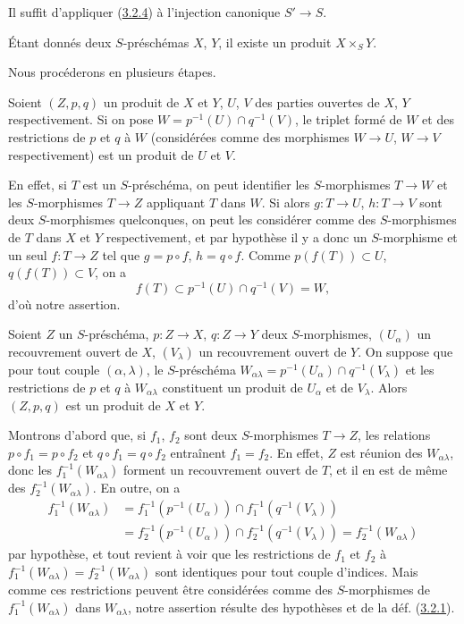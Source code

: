 Il suffit d'appliquer (\hyperref[I.3.2.4-fr]{3.2.4}) à l'injection canonique
$S'\to S$.

\begin{theorem}[3.2.6]
\label{I.3.2.6-fr}
Étant donnés deux $S$-préschémas $X$, $Y$, il existe un produit
$X\times_S Y$.
\end{theorem}

Nous procéderons en plusieurs étapes.

\begin{lemma}[3.2.6.1]
\label{I.3.2.6.1-fr}
Soient $(Z,p,q)$ un produit de $X$ et $Y$, $U$, $V$ des parties ouvertes de
$X$, $Y$ respectivement. Si on pose
$W=p^{-1}(U)\cap q^{-1}(V)$, le triplet formé de $W$ et des restrictions de
$p$ et $q$ à $W$ \textup{(considérées comme des morphismes $W\to U$,
$W\to V$ respectivement)} est un produit de $U$ et $V$.
\end{lemma}

En effet, si $T$ est un $S$-préschéma, on peut identifier les $S$-morphismes
$T\to W$ et les $S$-morphismes $T\to Z$ appliquant $T$ dans $W$. Si alors
$g:T\to U$, $h:T\to V$ sont deux $S$-morphismes quelconques, on peut les
considérer comme des $S$-morphismes de $T$ dans $X$ et $Y$ respectivement, et
par hypothèse il y a donc un $S$-morphisme et un seul $f:T\to Z$ tel que
$g=p\circ f$, $h=q\circ f$. Comme $p(f(T))\subset U$, $q(f(T))\subset V$,
on a
\[
  f(T)\subset p^{-1}(U)\cap q^{-1}(V)=W,
\]
d'où notre assertion.

\begin{lemma}[3.2.6.2]
\label{I.3.2.6.2-fr}
Soient $Z$ un $S$-préschéma, $p:Z\to X$, $q:Z\to Y$ deux $S$-morphismes,
$(U_\alpha)$ un recouvrement ouvert de $X$, $(V_\lambda)$ un recouvrement
ouvert de $Y$. On suppose que pour tout couple $(\alpha,\lambda)$, le
$S$-préschéma
$W_{\alpha\lambda}=p^{-1}(U_\alpha)\cap q^{-1}(V_\lambda)$ et les
restrictions de $p$ et $q$ à $W_{\alpha\lambda}$ constituent un produit de
$U_\alpha$ et de $V_\lambda$. Alors $(Z,p,q)$ est un produit de $X$ et $Y$.
\end{lemma}

Montrons d'abord que, si $f_1$, $f_2$ sont deux $S$-morphismes $T\to Z$, les
relations $p\circ f_1=p\circ f_2$ et $q\circ f_1=q\circ f_2$ entraînent
$f_1=f_2$. En effet, $Z$ est réunion des $W_{\alpha\lambda}$, donc les
$f_1^{-1}(W_{\alpha\lambda})$ forment un recouvrement ouvert de $T$, et il
en est de même des $f_2^{-1}(W_{\alpha\lambda})$. En outre, on a
\[
\begin{aligned}
  f_1^{-1}(W_{\alpha\lambda})
  &=f_1^{-1}(p^{-1}(U_\alpha))\cap
    f_1^{-1}(q^{-1}(V_\lambda)) \\
  &=f_2^{-1}(p^{-1}(U_\alpha))\cap
    f_2^{-1}(q^{-1}(V_\lambda))
   =f_2^{-1}(W_{\alpha\lambda})
\end{aligned}
\]
par hypothèse, et tout revient à voir que les restrictions de $f_1$ et $f_2$
à $f_1^{-1}(W_{\alpha\lambda})=f_2^{-1}(W_{\alpha\lambda})$ sont
identiques pour tout couple d'indices. Mais comme ces restrictions peuvent
être considérées comme des $S$-morphismes de
$f_1^{-1}(W_{\alpha\lambda})$ dans $W_{\alpha\lambda}$, notre assertion
résulte des hypothèses et de la déf. (\hyperref[I.3.2.1-fr]{3.2.1}).

